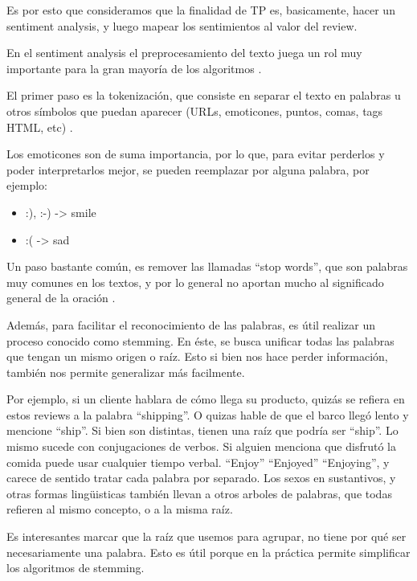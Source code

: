 Es por esto que consideramos que la finalidad de TP es, basicamente, hacer un sentiment analysis, y
luego mapear los sentimientos al valor del review.

En el sentiment analysis el preprocesamiento del texto juega un rol muy importante para la gran
mayor\'ia de los algoritmos \cite{importance_of_preprocessing}.

El primer paso es la tokenizaci\'on, que consiste en separar el texto en palabras u otros s\'imbolos
que puedan aparecer (URLs, emoticones, puntos, comas, tags HTML, etc) \cite{mining_twitter_data}.

Los emoticones son de suma importancia, por lo que, para evitar perderlos y poder
interpretarlos mejor, se pueden reemplazar por alguna palabra, por ejemplo:

\begin{itemize}
\setlength\itemsep{0em}
  \item :), :-) -> smile
  \item :( -> sad
\end{itemize}

Un paso bastante com\'un, es remover las llamadas ``stop words'', que son palabras muy comunes en
los textos, y por lo general no aportan mucho al significado general de la oraci\'on \cite{stopwords}.

Además, para facilitar el reconocimiento de las palabras, es \'util realizar un proceso conocido como stemming.
En \'este, se busca unificar todas las palabras que tengan un mismo origen o ra\'iz. Esto si bien nos hace perder informaci\'on,
también nos permite generalizar más facilmente.

Por ejemplo, si un cliente hablara de cómo llega su producto, quizás se refiera en estos reviews a la palabra ``shipping''. O quizas hable de que el barco llegó lento y mencione ``ship''. Si bien son distintas, tienen una raíz que podría ser ``ship''. Lo mismo sucede con conjugaciones de verbos. Si alguien menciona que disfrutó la comida puede usar cualquier tiempo verbal. ``Enjoy'' ``Enjoyed'' ``Enjoying'', y carece de sentido tratar cada palabra por separado. Los sexos en sustantivos, y otras formas lingüisticas también llevan a otros arboles de palabras, que todas refieren al mismo concepto, o a la misma raíz.

Es interesantes marcar que la raíz que usemos para agrupar, no tiene por qué ser necesariamente una palabra. Esto es útil porque en la práctica permite simplificar los algoritmos de stemming. \cite{word_stemming}

